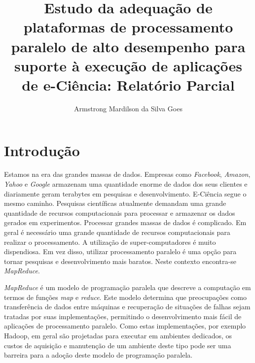 \documentclass[a4paper,10pt]{article}
\title{Estudo da adequação de plataformas de processamento paralelo de alto 
desempenho para suporte à execução de aplicações de e-Ciência: Relatório
Parcial}
\author{Armstrong Mardilson da Silva Goes}
\begin{document}
\maketitle

\section{Introdução}
Estamos na era das grandes massas de dados\cite{mapreduce_johnny}.
Empresas como \textit{Facebook}, \textit{Amazon}, \textit{Yahoo} e \textit{Google}
armazenam uma quantidade enorme de dados dos seus clientes e
diariamente geram terabytes em pesquisas e desenvolvimento.
E-Ciência segue o mesmo caminho. Pesquisas científicas atualmente demandam uma grande quantidade
de recursos computacionais para processar e armazenar os dados gerados em
experimentos. Processar grandes massas de dados é complicado. Em geral é
necessário uma grande quantidade de recursos computacionais para realizar o
processamento.
A utilização de super-computadores é muito dispendiosa. Em vez disso, utilizar processamento 
paralelo é uma opção para tornar pesquisas e desenvolvimento mais baratos. 
Neste contexto encontra-se \textit{MapReduce}.

\textit{MapReduce}\cite{Dean04mapreduce:simplified} é um modelo de programação
paralela que descreve a computação em termos de funções \textit{map} e
\textit{reduce}. Este modelo determina que preocupações como transferência de
dados entre máquinas e recuperação de situações de falhas sejam tratadas por
suas implementações, permitindo o desenvolvimento mais fácil de aplicações de
processamento paralelo. Como estas implementações, por exemplo
Hadoop\cite{hadoop_site}, em geral são projetadas para executar em ambientes
dedicados, os custos de aquisição e manutenção de um ambiente deste tipo pode
ser uma barreira para a adoção deste modelo de programação paralela.
\end{document}
